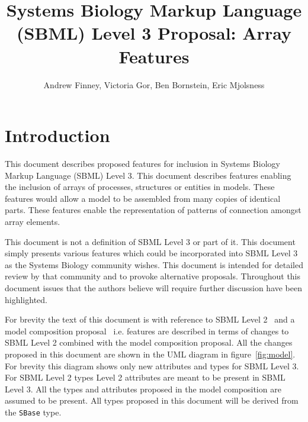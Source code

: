\documentclass{cekarticle}
\begin{document}

\title{Systems Biology Markup Language (SBML) Level 3 Proposal: Array Features}

\author{Andrew Finney, Victoria Gor, Ben Bornstein, Eric Mjolsness}


\maketitlepage

\section{Introduction}
\label{sec:introduction}

This document describes proposed features for inclusion in
Systems Biology Markup Language (SBML) Level 3. This document
describes features enabling the inclusion of arrays of processes,
structures or entities in models.  These features would allow a
model to be assembled from many copies of identical parts.  These
features enable the representation of patterns of connection
amongst array elements.

This document is not a definition of SBML Level 3 or part of it.
This document simply presents various features which could be
incorporated into SBML Level 3 as the Systems Biology community
wishes.  This document is intended for detailed review by that
community and to provoke alternative proposals.  Throughout this
document issues that the authors believe will require further
discussion have been highlighted.

For brevity the text of this document is with reference to SBML
Level 2~\citep{finney:2002f} and a model composition proposal~\citep{finney:2003b}  i.e. features are described in terms
of changes to SBML Level 2 combined with the model composition proposal.  
All the changes proposed in this document are shown in the UML diagram in figure~\ref{fig:model}.
For brevity this diagram
shows only new attributes and types for SBML Level 3.  For SBML Level 2 types Level 2
attributes are meant to be present in SBML Level 3.  All the types and attributes
proposed in the model composition are assumed to be present.
All types proposed in this document will be derived from the
\texttt{SBase} type.
\end{document}
